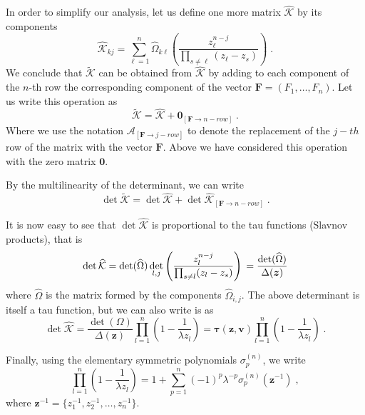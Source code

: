 \documentclass[a4paper,12pt]{amsart}
\begin{document}
In order to simplify our analysis, let us define one more matrix
\(\widehat{\mathcal{K}}\) by its components
\begin{equation}
    \widehat{\mathcal{K}}_{kj} = 
    \sum_{\ell = 1}^n  \widehat{\Omega}_{k \ell}
    \left( \frac{z_\ell^{n-j}}{\prod_{s\neq \ell} (z_\ell - z_s)} \right)
    \; .
\end{equation}
We conclude that \(\widetilde{\mathcal{K}}\) can be obtained from 
\(\widehat{\mathcal{K}}\) by adding to each component of the \(n\)-th row
the corresponding component of the vector \(\bm{F} = (F_1, \dots , F_n)\). 
Let us write this operation as 
\begin{equation}
  \widetilde{\mathcal{K}} = \widehat{\mathcal{K}} + \bm{0}_{[ \bm{F} \to n-row]}\; . 
\end{equation}
Where we use the notation \(\mathcal{A}_{[ \bm{F} \to j-row]} \) to
denote the replacement of the \(j-th\) row of the matrix with the
vector \(\bm{F}\).  Above we have considered this operation with the
zero matrix \(\bm{0}\).

By the multilinearity of the determinant, we can write
\begin{equation}
  \det \widetilde{\mathcal{K}} = 
    \det \widehat{\mathcal{K}} + 
    \det \widehat{\mathcal{K}}_{[\bm{F} \to n-row]}\; .
\end{equation}

It is now easy to see that \(\det \widehat{\mathcal{K}}\) is
proportional to the tau functions (Slavnov products), that is
\begin{equation}
    \det \widehat{\mathcal{K}}  = 
    \det(\widehat{\Omega})
    \det_{l,j}
    \left( \frac{z_l^{n-j}}{\prod_{s\neq l} (z_l - z_s)} \right)\\
    = \frac{\det(\widehat{\Omega})}{\Delta(\bm{z})}
\end{equation}
where \(\widehat{\Omega}\) is the matrix formed by the components
\(\widehat{\Omega}_{i,j}\). The above determinant is itself a tau function,
but we can also write is as
\begin{equation}
    \det \widehat{\mathcal{K}} = 
    \frac{\det(\Omega)}{\Delta(\bm{z})}
    \prod_{l=1}^n \left( 1 - \frac{1}{\lambda z_l} \right) 
    = \bm{\tau}(\bm{z}, \bm{v}) \prod_{l=1}^n \left( 1 - \frac{1}{\lambda z_l} \right) \; . 
\end{equation}

Finally, using the elementary symmetric polynomials \(\sigma_p^{(n)}\), we write
\begin{equation}
  \prod_{l=1}^n \left( 1 - \frac{1}{\lambda z_l} \right) = 1 + 
  \sum_{p=1}^n (-1)^p \lambda^{-p} \sigma_p^{(n)}(\bm{z}^{-1})\; , 
\end{equation}
where \( \bm{z}^{-1} = \{z_1^{-1}, z_2^{-1}, \dots , z_n^{-1}\}\). 
\end{document}
